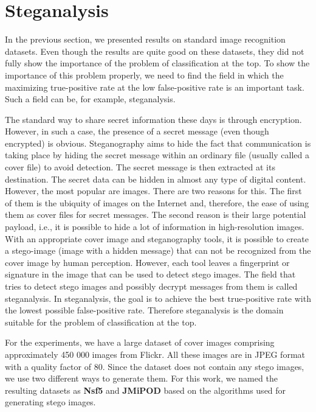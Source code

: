 \pagebreak

\section{Steganalysis}\label{sec: steganalysis}

In the previous section, we presented results on standard image recognition datasets. Even though the results are quite good on these datasets, they did not fully show the importance of the problem of classification at the top. To show the importance of this problem properly,  we need to find the field in which the maximizing true-positive rate at the low false-positive rate is an important task. Such a field can be, for example, steganalysis.

The standard way to share secret information these days is through encryption. However, in such a case, the presence of a secret message (even though encrypted) is obvious. Steganography aims to hide the fact that communication is taking place by hiding the secret message within an ordinary file (usually called a cover file) to avoid detection. The secret message is then extracted at its destination. The secret data can be hidden in almost any type of digital content. However, the most popular are images. There are two reasons for this. The first of them is the ubiquity of images on the Internet and, therefore, the ease of using them as cover files for secret messages. The second reason is their large potential payload, i.e., it is possible to hide a lot of information in high-resolution images. With an appropriate cover image and steganography tools, it is possible to create a stego-image (image with a hidden message) that can not be recognized from the cover image by human perception. However, each tool leaves a fingerprint or signature in the image that can be used to detect stego images. The field that tries to detect stego images and possibly decrypt messages from them is called steganalysis. In steganalysis, the goal is to achieve the best true-positive rate with the lowest possible false-positive rate. Therefore steganalysis is the domain suitable for the problem of classification at the top.~\cite{morkel2005overview, silman2001steganography} 

For the experiments, we have a large dataset of cover images comprising approximately 450 000 images from Flickr. All these images are in JPEG format with a quality factor of 80. Since the dataset does not contain any stego images, we use two different ways to generate them. For this work, we named the resulting datasets as \textbf{Nsf5} and \textbf{JMiPOD} based on the algorithms used for generating stego images.

